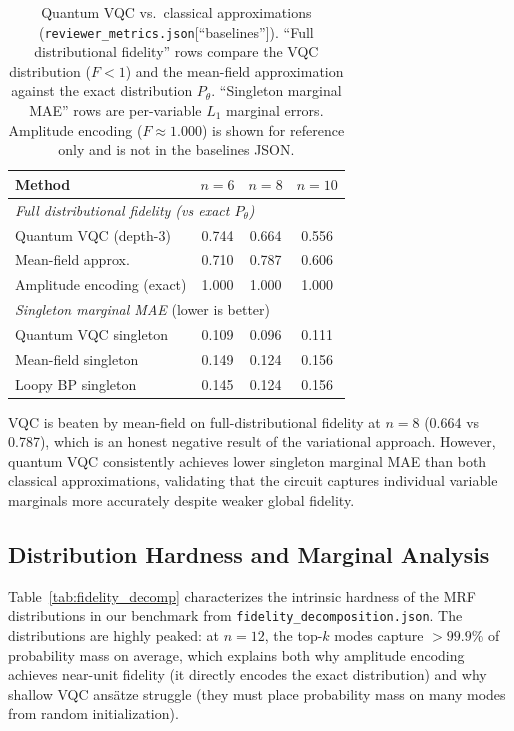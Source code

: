 \documentclass[conference,10pt]{IEEEtran}
\begin{document}
\begin{table}[t]
\centering
\caption{Quantum VQC vs.\ classical approximations (\texttt{reviewer\_metrics.json}[``baselines'']). ``Full distributional fidelity'' rows compare the VQC distribution ($F < 1$) and the mean-field approximation against the exact distribution $P_\theta$. ``Singleton marginal MAE'' rows are per-variable $L_1$ marginal errors. Amplitude encoding ($F\approx1.000$) is shown for reference only and is not in the baselines JSON.}
\label{tab:classical_baselines}
\begin{tabular}{lccc}
\toprule
\textbf{Method} & \textbf{$n=6$} & \textbf{$n=8$} & \textbf{$n=10$} \\
\midrule
\multicolumn{4}{l}{\textit{Full distributional fidelity (vs exact $P_\theta$)}} \\
Quantum VQC (depth-3)      & 0.744 & 0.664 & 0.556 \\
Mean-field approx.         & 0.710 & 0.787 & 0.606 \\
Amplitude encoding (exact) & 1.000 & 1.000 & 1.000 \\
\midrule
\multicolumn{4}{l}{\textit{Singleton marginal MAE} (lower is better)} \\
Quantum VQC singleton      & 0.109 & 0.096 & 0.111 \\
Mean-field singleton       & 0.149 & 0.124 & 0.156 \\
Loopy BP singleton         & 0.145 & 0.124 & 0.156 \\
\bottomrule
\end{tabular}
\par\smallskip
{\footnotesize VQC is beaten by mean-field on full-distributional fidelity at $n=8$ (0.664 vs 0.787), which is an honest negative result of the variational approach. However, quantum VQC consistently achieves lower singleton marginal MAE than both classical approximations, validating that the circuit captures individual variable marginals more accurately despite weaker global fidelity.}
\end{table}

\subsection{Distribution Hardness and Marginal Analysis}
\label{sec:marginals}

Table~\ref{tab:fidelity_decomp} characterizes the intrinsic hardness of the MRF distributions in our benchmark from \texttt{fidelity\_decomposition.json}. The distributions are highly peaked: at $n=12$, the top-$k$ modes capture $>99.9\%$ of probability mass on average, which explains both why amplitude encoding achieves near-unit fidelity (it directly encodes the exact distribution) and why shallow VQC ans\"atze struggle (they must place probability mass on many modes from random initialization).
\end{document}
